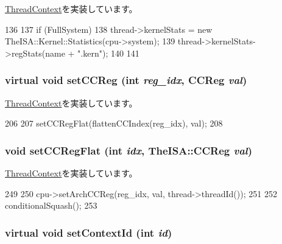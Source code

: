 \hyperlink{classThreadContext_a6450b5fad5603ec545c4bf5ff01e0646}{ThreadContext}を実装しています。


\begin{DoxyCode}
136 {
137     if (FullSystem) {
138         thread->kernelStats = new TheISA::Kernel::Statistics(cpu->system);
139         thread->kernelStats->regStats(name + ".kern");
140     }
141 }
\end{DoxyCode}
\hypertarget{classO3ThreadContext_a6930132fc79b2f672ac4076133d103b3}{
\subsubsection[{setCCReg}]{\setlength{\rightskip}{0pt plus 5cm}virtual void setCCReg (int {\em reg\_\-idx}, \/  {\bf CCReg} {\em val})}}
\label{classO3ThreadContext_a6930132fc79b2f672ac4076133d103b3}


\hyperlink{classThreadContext_a276736f0c1f99f27ed95348979e8b8c6}{ThreadContext}を実装しています。


\begin{DoxyCode}
206                                                   {
207         setCCRegFlat(flattenCCIndex(reg_idx), val);
208     }
\end{DoxyCode}
\hypertarget{classO3ThreadContext_a6dec2284dd5904f992642f24bb289f14}{
\subsubsection[{setCCRegFlat}]{\setlength{\rightskip}{0pt plus 5cm}void setCCRegFlat (int {\em idx}, \/  TheISA::CCReg {\em val})}}
\label{classO3ThreadContext_a6dec2284dd5904f992642f24bb289f14}


\hyperlink{classThreadContext_ab1028831649236bd6f229a4561663fd9}{ThreadContext}を実装しています。


\begin{DoxyCode}
249 {
250     cpu->setArchCCReg(reg_idx, val, thread->threadId());
251 
252     conditionalSquash();
253 }
\end{DoxyCode}
\hypertarget{classO3ThreadContext_a5dddb107b15d8fe6fc941ed0b9654fd2}{
\subsubsection[{setContextId}]{\setlength{\rightskip}{0pt plus 5cm}virtual void setContextId (int {\em id})}}
\label{classO3ThreadContext_a5dddb107b15d8fe6fc941ed0b9654fd2}


